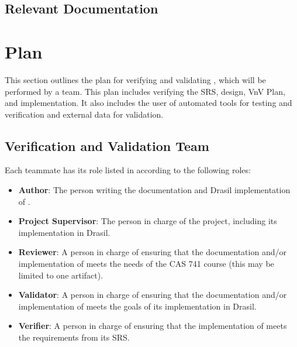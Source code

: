 \documentclass[12pt, titlepage]{article}
\begin{document}
\subsection{Relevant Documentation}


\cite{SRS}

\section{Plan} \label{sec_plan}

This section outlines the plan for verifying and validating \progname{}, which
will be performed by a team. This plan includes verifying the SRS, design,
VnV Plan, and implementation. It also includes the user of automated tools for
testing and verification and external data for validation.

\subsection{Verification and Validation Team} \label{sec_vnv_team}

Each teammate has its role listed in  according to the
following roles:

\begin{itemize}
  \item \textbf{Author}: The person writing the documentation and Drasil
        implementation of \progname{}.

  \item \textbf{Project Supervisor}: The person in charge of the \progname{}
        project, including its implementation in Drasil.

  \item \textbf{Reviewer}: A person in charge of ensuring that the
        documentation and/or implementation of \progname{} meets the needs of
        the CAS 741 course (this may be limited to one artifact).

  \item \textbf{Validator}: A person in charge of ensuring that the
        documentation and/or implementation of \progname{} meets the goals of
        its implementation in Drasil.

  \item \textbf{Verifier}: A person in charge of ensuring that the
        implementation of \progname{} meets the requirements from its SRS.

\end{itemize}
\end{document}
